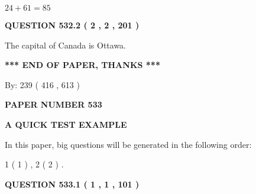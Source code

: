 \documentclass[12pt]{article}
\begin{document}
$ %
24 +  %
61=   %
85$
 
 
  
\vspace{0.2in}
  
{\textbf{\Large{QUESTION
532.2 
 ( 2 , 2 , 201 )
}}}
  
  
 
 
\noindent{}
 
 
The capital of Canada is Ottawa.
 
 
 
 
   
   
 \vspace{0.2in}
 
   
   
   
   
\vspace{1.0in} 
{\textbf{\large{ *** END OF PAPER, THANKS *** }}} 
   
   
\hspace{1.0in} By: 
 239 ( 416 ,  613 )
   
   
   
   
\newpage 
\setcounter{page}{ 
   533001 } 
   
   
   
   
 {\textbf{ \Large{ PAPER NUMBER  533  }}}
   
   
\vspace{0.2in}
   
   
   
   
   
   
 \vspace{0.2in}
{\LARGE {\textbf{ A QUICK TEST EXAMPLE}}}
   
   
   
\vspace{0.2in}
   
In this paper, big questions will be generated in the following order: 
   
   
   1 ( 1 )
 ,
   2 ( 2 )
 .
  
\vspace{0.2in}
  
{\textbf{\Large{QUESTION
533.1 
 ( 1 , 1 , 101 )
}}}
  
  
 
 
\noindent{}
\end{document}
